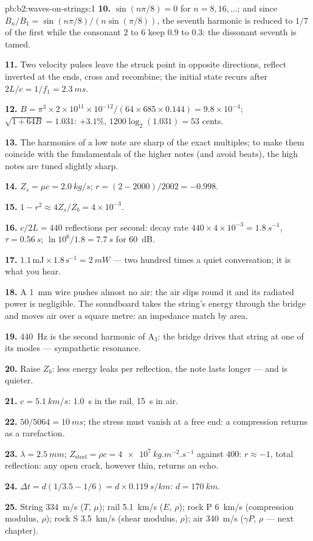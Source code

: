 \begin{solution}{pb:b2:waves-on-strings:1}
\textbf{10.} $\sin(n\pi/8) = 0$ for $n = 8, 16, \dots$; and since $B_n/B_1 =
\sin(n\pi/8)/(n\sin(\pi/8))$, the seventh harmonic is reduced to $1/7$ of the
first while the consonant $2$ to $6$ keep $0.9$ to $0.3$: the dissonant
seventh is tamed.

\textbf{11.} Two velocity pulses leave the struck point in opposite
directions, reflect inverted at the ends, cross and recombine; the
initial state recurs after $2L/c = 1/f_1 = \qty{2.3}{ms}$.

\textbf{12.} $B = \pi^3 \times 2 \times 10^{11} \times 10^{-12}/(64 \times 685 \times 0.144) =
9.8 \times 10^{-4}$; $\sqrt{1 + 64B} = 1.031$: $+3.1\%$, $1200\log_2(1.031) = 53$ cents.

\textbf{13.} The harmonics of a low note are sharp of the exact
multiples; to make them coincide with the fundamentals of the higher
notes (and avoid beats), the high notes are tuned slightly sharp.

\textbf{14.} $Z_s = \mu c = \qty{2.0}{kg/s}$; $r = (2 - 2000)/2002 = -0.998$.

\textbf{15.} $1 - r^2 \approx 4Z_s/Z_b = 4 \times 10^{-3}$.

\textbf{16.} $c/2L = 440$ reflections per second: decay rate $440 \times 4 \times
10^{-3} = \qty{1.8}{s^{-1}}$, $\tau = \qty{0.56}{s}$; $\ln10^6/1.8 = \qty{7.7}{s}$ for
\qty{60}{dB}.

\textbf{17.} $1.1\,\text{mJ} \times 1.8\,\text{s}^{-1} = \qty{2}{mW}$ --- two hundred
times a quiet conversation; it is what you hear.

\textbf{18.} A \qty{1}{mm} wire pushes almost no air: the air slips round
it and its radiated power is negligible. The soundboard takes the
string's energy through the bridge and moves air over a square metre:
an impedance match by area.

\textbf{19.} \qty{440}{Hz} is the second harmonic of A$_3$: the bridge drives
that string at one of its modes --- sympathetic resonance.

\textbf{20.} Raise $Z_b$: less energy leaks per reflection, the note lasts
longer --- and is quieter.

\textbf{21.} $c = \qty{5.1}{km/s}$: \qty{1.0}{s} in the rail, \qty{15}{s} in air.

\textbf{22.} $50/5064 = \qty{10}{ms}$; the stress must vanish at a free end:
a compression returns as a rarefaction.

\textbf{23.} $\lambda = \qty{2.5}{mm}$; $Z_{\text{steel}} = \rho c = \qty{4e7}{kg.m^{-2}.s^{-1}}$
against $400$: $r \approx -1$, total reflection: any open crack, however
thin, returns an echo.

\textbf{24.} $\Delta t = d(1/3.5 - 1/6) = d \times \qty{0.119}{s/km}$: $d = \qty{170}{km}$.

\textbf{25.} String \qty{334}{m/s} ($T$, $\mu$); rail \qty{5.1}{km/s} ($E$, $\rho$);
rock P \qty{6}{km/s} (compression modulus, $\rho$); rock S \qty{3.5}{km/s}
(shear modulus, $\rho$); air \qty{340}{m/s} ($\gamma P$, $\rho$ --- next chapter).
\end{solution}
